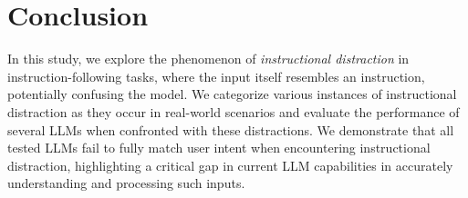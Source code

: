 \section{Conclusion}

In this study, we explore the phenomenon of \textit{instructional distraction} in instruction-following tasks, where the input itself resembles an instruction, potentially confusing the model. 
We categorize various instances of instructional distraction as they occur in real-world scenarios and evaluate the performance of several LLMs when confronted with these distractions. 
We demonstrate that all tested LLMs fail to fully match user intent when encountering instructional distraction, highlighting a critical gap in current LLM capabilities in accurately understanding and processing such inputs. 

